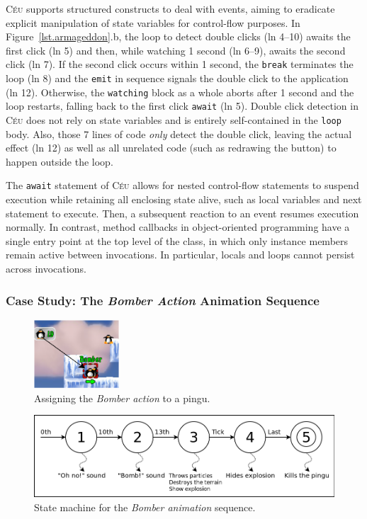 \documentclass[times,twocolumn,final]{elsarticle}
\newcommand{\CEU}{\textsc{C\'{e}u}\xspace}
\newcommand{\code}[1] {{\small{\texttt{#1}}}}
\begin{document}
\CEU supports structured constructs to deal with events, aiming to eradicate
explicit manipulation of state variables for control-flow purposes.
%
In Figure~\ref{lst.armageddon}.b, the loop to detect double clicks (ln 4--10)
awaits the first click (ln 5) and then, while watching 1 second (ln 6--9),
awaits the second click (ln 7).
If the second click occurs within 1 second, the \code{break} terminates the
loop (ln 8) and the \code{emit} in sequence signals the double click to the
application (ln 12).
Otherwise, the \code{watching} block as a whole aborts after 1 second  and the
loop restarts, falling back to the first click \code{await} (ln 5).
%
Double click detection in \CEU does not rely on state variables and is entirely
self-contained in the \code{loop} body.
Also, those 7 lines of code \emph{only} detect the double click, leaving the
actual effect (ln 12) as well as all unrelated code (such as redrawing the
button) to happen outside the loop.

The \code{await} statement of \CEU allows for nested control-flow statements to
suspend execution while retaining all enclosing state alive, such as local
variables and next statement to execute.
Then, a subsequent reaction to an event resumes execution normally.
In contrast, method callbacks in object-oriented programming have a single
entry point at the top level of the class, in which only instance members
remain active between invocations.
In particular, locals and loops cannot persist across invocations.

\subsubsection{Case Study: The \emph{Bomber Action} Animation Sequence}
\label{sec.pats.fsms.2}

\begin{figure}
\centering
\includegraphics[width=120px]{bomber-01}
\caption{ Assigning the \emph{Bomber action} to a pingu.
\label{fig.bomber.action}
}
\end{figure}

\begin{figure}
\centering
\includegraphics[width=\columnwidth]{states}
\caption{ State machine for the \emph{Bomber animation} sequence.
\label{fig.bomber.fsm}
}
\end{figure}
\end{document}
